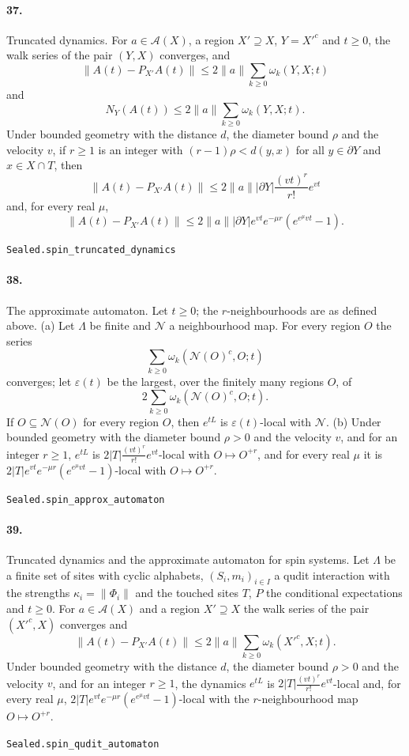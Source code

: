 \documentclass[11pt]{article}
\begin{document}
\paragraph{37.} Truncated dynamics. For $a \in \mathcal A(X)$, a region $X' \supseteq X$, $Y = X'^c$ and $t \ge 0$, the walk series of the pair $(Y, X)$ converges, and \[\|A(t) - P_{X'} A(t)\| \le 2\|a\| \sum_{k \ge 0} \omega_k(Y, X; t)\] and \[N_Y(A(t)) \le 2\|a\| \sum_{k \ge 0} \omega_k(Y, X; t).\] Under bounded geometry with the distance $d$, the diameter bound $\rho$ and the velocity $v$, if $r \ge 1$ is an integer with $(r - 1)\rho < d(y, x)$ for all $y \in \partial Y$ and $x \in X \cap T$, then \[\|A(t) - P_{X'} A(t)\| \le 2\|a\| |\partial Y| \frac{(vt)^r}{r!} e^{vt}\] and, for every real $\mu$, \[\|A(t) - P_{X'} A(t)\| \le 2\|a\| |\partial Y| e^{vt} e^{-\mu r} (e^{e^\mu v t} - 1).\]\par{\footnotesize\texttt{Sealed.spin\_truncated\_dynamics}}

\paragraph{38.} The approximate automaton. Let $t \ge 0$; the $r$-neighbourhoods are as defined above. (a) Let $\Lambda$ be finite and $\mathcal N$ a neighbourhood map. For every region $O$ the series \[\sum_{k \ge 0} \omega_k(\mathcal N(O)^c, O; t)\] converges; let $\varepsilon(t)$ be the largest, over the finitely many regions $O$, of \[2 \sum_{k \ge 0} \omega_k(\mathcal N(O)^c, O; t).\] If $O \subseteq \mathcal N(O)$ for every region $O$, then $e^{tL}$ is $\varepsilon(t)$-local with $\mathcal N$. (b) Under bounded geometry with the diameter bound $\rho > 0$ and the velocity $v$, and for an integer $r \ge 1$, $e^{tL}$ is $2|T| \frac{(vt)^r}{r!} e^{vt}$-local with $O \mapsto O^{+r}$, and for every real $\mu$ it is $2|T| e^{vt} e^{-\mu r} (e^{e^\mu v t} - 1)$-local with $O \mapsto O^{+r}$.\par{\footnotesize\texttt{Sealed.spin\_approx\_automaton}}

\paragraph{39.} Truncated dynamics and the approximate automaton for spin systems. Let $\Lambda$ be a finite set of sites with cyclic alphabets, $(S_i, m_i)_{i \in I}$ a qudit interaction with the strengths $\kappa_i = \|\Phi_i\|$ and the touched sites $T$, $P$ the conditional expectations and $t \ge 0$. For $a \in \mathcal A(X)$ and a region $X' \supseteq X$ the walk series of the pair $(X'^c, X)$ converges and \[\|A(t) - P_{X'} A(t)\| \le 2\|a\| \sum_{k \ge 0} \omega_k(X'^c, X; t).\] Under bounded geometry with the distance $d$, the diameter bound $\rho > 0$ and the velocity $v$, and for an integer $r \ge 1$, the dynamics $e^{tL}$ is $2|T| \frac{(vt)^r}{r!} e^{vt}$-local and, for every real $\mu$, $2|T| e^{vt} e^{-\mu r} (e^{e^\mu v t} - 1)$-local with the $r$-neighbourhood map $O \mapsto O^{+r}$.\par{\footnotesize\texttt{Sealed.spin\_qudit\_automaton}}
\end{document}
